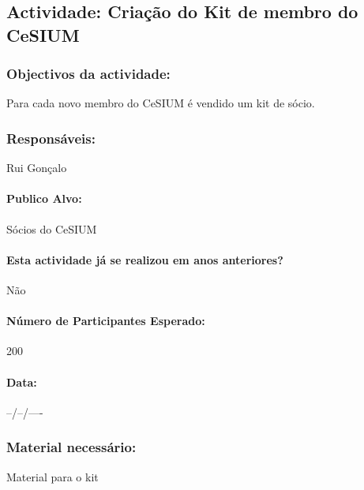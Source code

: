 \subsection{Actividade: Criação do Kit de membro do CeSIUM} %

\subsubsection*{Objectivos da actividade:}
Para cada novo membro do CeSIUM é vendido um kit de sócio.

\subsubsection*{Responsáveis:}
\begin{itemizedash}
	\item{Rui Gonçalo}
\end{itemizedash}

\paragraph{Publico Alvo: }
Sócios do CeSIUM

\paragraph{Esta actividade já se realizou em anos anteriores?}
Não

\paragraph{Número de Participantes Esperado:}
200

\paragraph{Data:} --/--/----

\subsubsection*{Material necessário:}
\begin{itemizedash}
	\item{Material para o kit}
\end{itemizedash}

